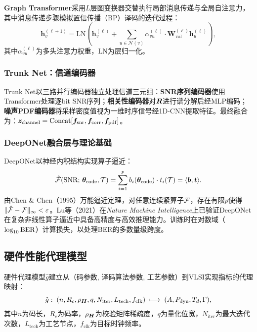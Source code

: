\textbf{Graph Transformer}采用$L$层图变换器交替执行局部消息传递与全局自注意力，其中消息传递步骤模拟置信传播（BP）译码的迭代过程：
\begin{equation}
  \bm{h}_v^{(\ell+1)} = \mathrm{LN}\!\left(\bm{h}_v^{(\ell)} + \sum_{u \in \mathcal{N}(v)} \alpha_{vu}^{(\ell)} \cdot \bm{W}_{\mathrm{val}}^{(\ell)} \bm{h}_u^{(\ell)}\right),
  \label{eq:graph_transformer}
\end{equation}
其中$\alpha_{vu}^{(\ell)}$为多头注意力权重，$\mathrm{LN}$为层归一化。

\subsubsection{Trunk Net：信道编码器}

Trunk Net以三路并行编码器独立处理信道三元组：\textbf{SNR序列编码器}使用Transformer处理逐bit SNR序列；\textbf{相关性编码器}对$\bm{R}$进行谱分解后经MLP编码；\textbf{噪声PDF编码器}将采样密度值视为一维时序信号经1D-CNN提取特征。最终融合为：$\bm{z}_{\mathrm{channel}} = \mathrm{Concat}[\bm{f}_{\mathrm{snr}}, \bm{f}_{\mathrm{corr}}, \bm{f}_{\mathrm{pdf}}]$。

\subsubsection{DeepONet融合层与理论基础}

DeepONet以神经内积结构实现算子逼近：
\begin{equation}
  \hat{\mathcal{F}}(\mathrm{SNR};\,\bm{\theta}_{\mathrm{code}},\mathcal{T}) = \sum_{i=1}^{p} b_i(\bm{\theta}_{\mathrm{code}})\cdot t_i(\mathcal{T}) = \langle\bm{b}, \bm{t}\rangle.
  \label{eq:deeponet}
\end{equation}
由Chen \& Chen（1995）万能逼近定理\cite{chen1995}，对任意连续紧算子$\mathcal{F}$，存在有限$p$使得$\|\hat{\mathcal{F}} - \mathcal{F}\|_\infty < \varepsilon$。Lu等（2021）\cite{lu2021}在\textit{Nature Machine Intelligence}上已验证DeepONet在复杂非线性算子逼近中具备高精度与高效推理能力。训练时在对数域（$\log_{10}\mathrm{BER}$）计算损失，以处理BER的多数量级跨度。

\subsection{硬件性能代理模型}\label{sec:hw_proxy}

硬件代理模型$\hat{g}$建立从（码参数, 译码算法参数, 工艺参数）到VLSI实现指标的代理映射：
\begin{equation}
  \hat{g}:\;(n, R_c, \rho_{\bm{H}}, q, N_{\mathrm{iter}}, L_{\mathrm{tech}}, f_{\mathrm{clk}})
  \;\longmapsto\;(A, P_{\mathrm{dyn}}, T_d, \Gamma),
  \label{eq:hw_proxy}
\end{equation}
其中$n$为码长，$R_c$为码率，$\rho_{\bm{H}}$为校验矩阵稀疏度，$q$为量化位宽，$N_{\mathrm{iter}}$为最大迭代次数，$L_{\mathrm{tech}}$为工艺节点，$f_{\mathrm{clk}}$为目标时钟频率。

